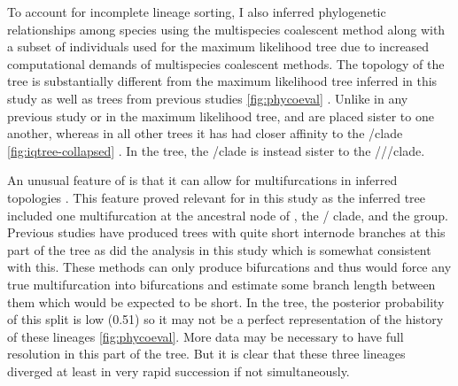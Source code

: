 To account for incomplete lineage sorting, I also inferred phylogenetic     
relationships among \anaxyrus species using the multispecies coalescent 
method \phycoeval along with a subset of individuals used for the maximum likelihood 
tree due to increased computational demands of multispecies coalescent methods. 
The topology of the \phycoeval tree is substantially different from the  
maximum likelihood tree inferred in this study as well as trees from previous 
studies \cref{fig:phycoeval} \parencite{fontenot2011,graybeal1997,masta2002,pramuk2007,pyron2011,portik2023}. 
Unlike in any previous study or in the maximum likelihood tree, \amer and \terr are 
placed sister to one another, whereas in all other trees it has had closer 
affinity to the \hemiophrys/\baxteri clade \cref{fig:iqtree-collapsed} \parencite{pyron2011,portik2023}.
In the \phycoeval tree, the \hemiophrys/\baxteri clade is instead sister
to the \amer/\fowl/\terr/\wood clade.

An unusual feature of \phycoeval is that it can allow for multifurcations in  
inferred topologies \parencite{oaks2022}.
This feature proved relevant for in this study as the inferred tree included
one multifurcation at the ancestral node of \quercicus, the \cognatus/\speciosus
clade, and the \americanus group. 
Previous studies have produced trees with quite short internode branches at this
part of the tree as did the \iqtree analysis in this study which is somewhat 
consistent with this. 
These methods can only produce bifurcations and thus would force any true 
multifurcation into bifurcations and estimate some branch length between them
which would be expected to be short. 
In the \phycoeval tree, the posterior probability of this split is low (0.51) so 
it may not be a perfect representation of the history of these lineages \cref{fig:phycoeval}.
More data may be necessary to have full resolution in this part of the tree.
But it is clear that these three lineages diverged at least in very rapid succession
if not simultaneously. 



